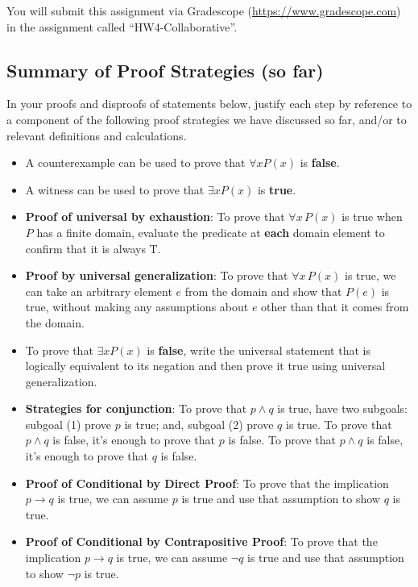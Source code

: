 \documentclass[12pt, oneside]{article}
\begin{document}
You will submit this assignment via Gradescope
(\href{https://www.gradescope.com}{https://www.gradescope.com}) in the assignment called ``HW4-Collaborative''.

\subsection*{Summary of Proof Strategies (so far)}
In your proofs and disproofs of statements below, justify each  step
by reference to  a component of the  following proof  strategies
we  have discussed so far, and/or to relevant definitions and calculations.
\begin{itemize}
    \item A counterexample can be used to prove that  $\forall x P(x)$ is {\bf false}.
    \item  A witness can be used  to  prove that  $\exists x P(x)$ is {\bf true}.
    \item {\bf Proof of universal by exhaustion}: To prove that $\forall x \, P(x)$
is true when $P$ has a finite domain, evaluate the predicate at {\bf each} domain element to confirm that it is always T.
    \item  {\bf Proof by universal generalization}: To prove that $\forall x \, P(x)$
is true, we can take an arbitrary element $e$ from the domain and show that $P(e)$ is true, without making any assumptions about $e$ other than that it comes from the domain.
    \item To  prove  that $\exists x P(x)$ is {\bf false}, write the universal statement that is logically equivalent to its negation and then prove it true using universal generalization.
    \item {\bf Strategies for conjunction}: To prove that $p \land q$ is true, have two subgoals: subgoal (1) prove $p$ 
is  true; and, subgoal (2) prove $q$ is true. To prove that $p \land q$ is false, it's enough to prove that $p$ is false.
 To prove that $p \land q$ is false, it's enough to prove that $q$ is false.
    \item {\bf Proof of Conditional by Direct Proof}: To prove that the implication $p \to q$ is true, we can assume $p$ is true and use that assumption to show $q$ is true.
    \item {\bf Proof of Conditional by Contrapositive Proof}: To prove that the implication $p \to q$ is true, we can assume $\neg q$ is true and use that assumption to show $\neg p$ is true.
   
\end{itemize}
\end{document}
